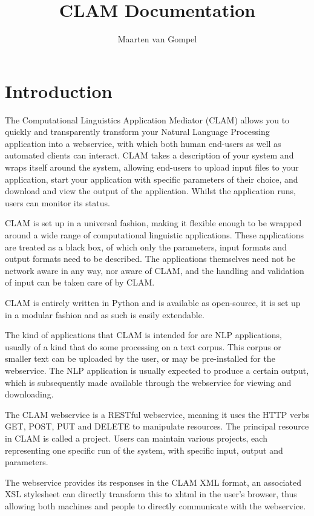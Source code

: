 \documentclass[a4paper,12pt]{report}
\title{CLAM Documentation}
\author{Maarten van Gompel}
\begin{document}
\maketitle

\chapter{Introduction} 

The Computational Linguistics Application Mediator (CLAM) allows you to quickly and transparently transform your Natural Language Processing application into a webservice, with which both human end-users as well as automated clients can interact. CLAM takes a description of your system and wraps itself around the system, allowing end-users to upload input files to your application, start your application with specific parameters of their choice, and download and view the output of the application. Whilst the application runs, users can monitor its status.

CLAM is set up in a universal fashion, making it flexible enough to be wrapped around a wide range of computational linguistic applications. These applications are treated as a black box, of which only the parameters, input formats and output formats need to be described. The applications themselves need not be network aware in any way, nor aware of CLAM, and the handling and validation of input can be taken care of by CLAM.

CLAM is entirely written in Python and is available as open-source, it is set up in a modular fashion and as such is easily extendable. 

The kind of applications that CLAM is intended for are NLP applications, usually of a kind that do some processing on a text corpus. This corpus or smaller text can be uploaded by the user, or may be pre-installed for the webservice. The NLP application is usually expected to produce a certain output, which is subsequently made available through the webservice for viewing and downloading.

The CLAM webservice is a RESTful webservice, meaning it uses the HTTP verbs GET, POST, PUT and DELETE to manipulate resources. The principal resource in CLAM is called a project. Users can maintain various projects, each representing one specific run of the system, with specific input, output and parameters.

The webservice provides its responses in the CLAM XML format, an associated XSL stylesheet can directly transform this to xhtml in the user's browser, thus allowing both machines and people to directly communicate with the webservice.
\end{document}
